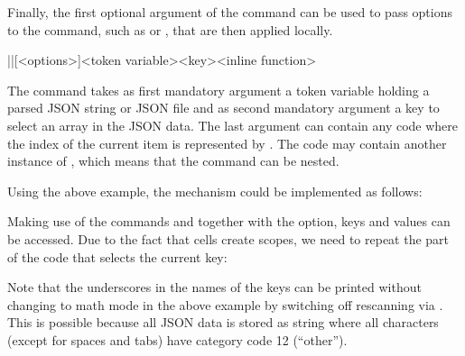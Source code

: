 \documentclass[a4paper]{article}
\begin{document}
{{Finally, the first optional argument of the command can be used to pass options to the command, such as  or , that are then applied locally.

\begin{macrodef}
|\JSONParseArrayMapInline|[<options>]{<token variable>}{<key>}{<inline function>}
\end{macrodef}
The command \macro{\JSONParseArrayMapInline} takes as first mandatory argument a token variable holding a parsed JSON string or JSON file and as second mandatory argument a key to select an array in the JSON data. The last argument can contain any code where the index of the current item is represented by . The code may contain another instance of \macro{\JSONParseArrayMapInline}, which means that the command can be nested.

Using the above example, the mechanism could be implemented as follows:

\begin{codeexamplecolumns}
\end{codeexamplecolumns}

Making use of the commands \macro{\JSONParseKeys} and \macro{\JSONParseValue} together with the  option, keys and values can be accessed. Due to the fact that cells create scopes, we need to repeat the part of the code that selects the current key:


Note that the underscores in the names of the keys can be printed without changing to math mode in the above example by switching off rescanning via . This is possible because all JSON data is stored as string where all characters (except for spaces and tabs) have category code 12 (``other'').

}}
\end{document}
